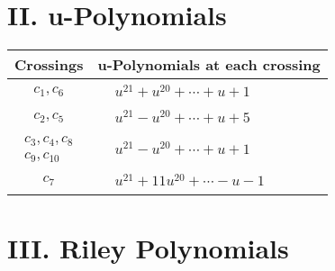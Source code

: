 \documentclass[1p]{elsarticle_modified}
\theoremstyle{definition}
\begin{document}
\newpage\renewcommand{\arraystretch}{1}
\centering \section*{ II. u-Polynomials}
\begin{tabular}{m{50pt}|m{274pt}}
Crossings & \hspace{64pt}u-Polynomials at each crossing \\
\hline $$\begin{aligned}c_{1},c_{6}\end{aligned}$$&$\begin{aligned}
&u^{21}+u^{20}+\cdots+u+1
\end{aligned}$\\
\hline $$\begin{aligned}c_{2},c_{5}\end{aligned}$$&$\begin{aligned}
&u^{21}- u^{20}+\cdots+u+5
\end{aligned}$\\
\hline $$\begin{aligned}c_{3},c_{4},c_{8}\\c_{9},c_{10}\end{aligned}$$&$\begin{aligned}
&u^{21}- u^{20}+\cdots+u+1
\end{aligned}$\\
\hline $$\begin{aligned}c_{7}\end{aligned}$$&$\begin{aligned}
&u^{21}+11 u^{20}+\cdots- u-1
\end{aligned}$\\
\hline
\end{tabular}\newpage\renewcommand{\arraystretch}{1}
\centering \section*{ III. Riley Polynomials}
\end{document}
